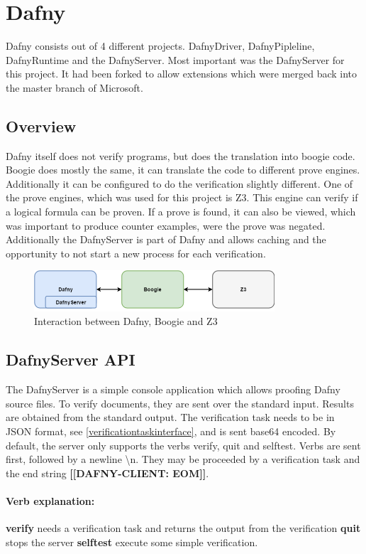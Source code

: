\section{Dafny}
Dafny consists out of 4 different projects. DafnyDriver, DafnyPipleline, DafnyRuntime and the DafnyServer. Most important was the DafnyServer for this project. It had been forked to allow extensions which were merged back into the master branch of Microsoft. 

\subsection{Overview}
Dafny itself does not verify programs, but does the translation into boogie code. Boogie does mostly the same, it can translate the code to different prove engines. Additionally it can be configured to do the verification slightly different. One of the prove engines, which was used for this project is Z3. This engine can verify if a logical formula can be proven. If a prove is found, it can also be viewed, which was important to produce counter examples, were the prove was negated. 
Additionally the DafnyServer is part of Dafny and allows caching and the opportunity to not start a new process for each verification. 

\begin{figure}[H]
	\centering
	\includegraphics[width=0.8\textwidth]{img/dafny_overview}
	\caption{Interaction between Dafny, Boogie and Z3}
	\label{fig:dafny_overview}
\end{figure}


\subsection{DafnyServer API}
The DafnyServer is a simple console application which allows proofing Dafny source files. To verify documents, they are sent over the standard input. Results are obtained from the standard output. The verification task needs to be in JSON format, see \ref{verificationtaskinterface}, and is sent base64 encoded. By default, the server only supports the verbs verify, quit and selftest. Verbs are sent first, followed by a newline \textbackslash{n}. They may be proceeded by a verification task and the end string \textbf{[[DAFNY-CLIENT: EOM]]}. 
\paragraph{Verb explanation:}
\textbf{verify} needs a verification task and returns the output from the verification\newline
\textbf{quit} stops the server \newline
\textbf{selftest} execute some simple verification. \newline

